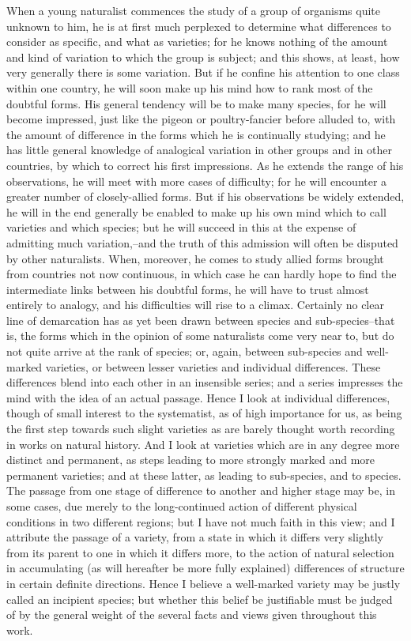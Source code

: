 When a young naturalist commences the study of a group of organisms quite unknown to him, he is at first much perplexed to determine what differences to consider as specific, and what as varieties; for he knows nothing of the amount and kind of variation to which the group is subject; and this shows, at least, how very generally there is some variation. But if he confine his attention to one class within one country, he will soon make up his mind how to rank most of the doubtful forms. His general tendency will be to make many species, for he will become impressed, just like the pigeon or poultry-fancier before alluded to, with the amount of difference in the forms which he is continually studying; and he has little general knowledge of analogical variation in other groups and in other countries, by which to correct his first impressions. As he extends the range of his observations, he will meet with more cases of difficulty; for he will encounter a greater number of closely-allied forms. But if his observations be widely extended, he will in the end generally be enabled to make up his own mind which to call varieties and which species; but he will succeed in this at the expense of admitting much variation,--and the truth of this admission will often be disputed by other naturalists. When, moreover, he comes to study allied forms brought from countries not now continuous, in which case he can hardly hope to find the intermediate links between his doubtful forms, he will have to trust almost entirely to analogy, and his difficulties will rise to a climax.
Certainly no clear line of demarcation has as yet been drawn between species and sub-species--that is, the forms which in the opinion of some naturalists come very near to, but do not quite arrive at the rank of species; or, again, between sub-species and well-marked varieties, or between lesser varieties and individual differences. These differences blend into each other in an insensible series; and a series impresses the mind with the idea of an actual passage.
Hence I look at individual differences, though of small interest to the systematist, as of high importance for us, as being the first step towards such slight varieties as are barely thought worth recording in works on natural history. And I look at varieties which are in any degree more distinct and permanent, as steps leading to more strongly marked and more permanent varieties; and at these latter, as leading to sub-species, and to species. The passage from one stage of difference to another and higher stage may be, in some cases, due merely to the long-continued action of different physical conditions in two different regions; but I have not much faith in this view; and I attribute the passage of a variety, from a state in which it differs very slightly from its parent to one in which it differs more, to the action of natural selection in accumulating (as will hereafter be more fully explained) differences of structure in certain definite directions. Hence I believe a well-marked variety may be justly called an incipient species; but whether this belief be justifiable must be judged of by the general weight of the several facts and views given throughout this work.
